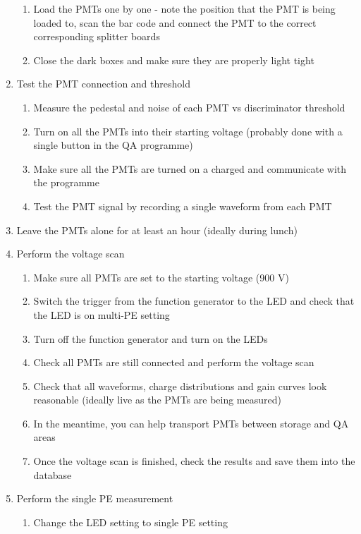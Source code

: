 \documentclass[12pt,a4paper]{article}
\begin{document}
\begin{enumerate}
    \begin{enumerate}
      \item Load the PMTs one by one - note the position that the PMT is being loaded to, scan the bar code and connect the PMT to the correct corresponding splitter boards
      \item Close the dark boxes and make sure they are properly light tight
    \end{enumerate}
    \item Test the PMT connection and threshold
    \begin{enumerate}
      \item Measure the pedestal and noise of each PMT vs discriminator threshold
      \item Turn on all the PMTs into their starting voltage (probably done with a single button in the QA programme)
      \item Make sure all the PMTs are turned on a charged and communicate with the programme
      \item Test the PMT signal by recording a single waveform from each PMT
    \end{enumerate}
    \item Leave the PMTs alone for at least an hour (ideally during lunch)
    \item Perform the voltage scan
    \begin{enumerate}
      \item Make sure all PMTs are set to the starting voltage (900 V)
      \item Switch the trigger from the function generator to the LED and check that the LED is on multi-PE setting
      \item Turn off the function generator and turn on the LEDs
      \item Check all PMTs are still connected and perform the voltage scan
      \item Check that all waveforms, charge distributions and gain curves look reasonable (ideally live as the PMTs are being measured)
      \item In the meantime, you can help transport PMTs between storage and QA areas
      \item Once the voltage scan is finished, check the results and save them into the database
    \end{enumerate}
    \item Perform the single PE measurement
    \begin{enumerate}
      \item Change the LED setting to single PE setting

\end{enumerate}
\end{enumerate}
\end{document}
